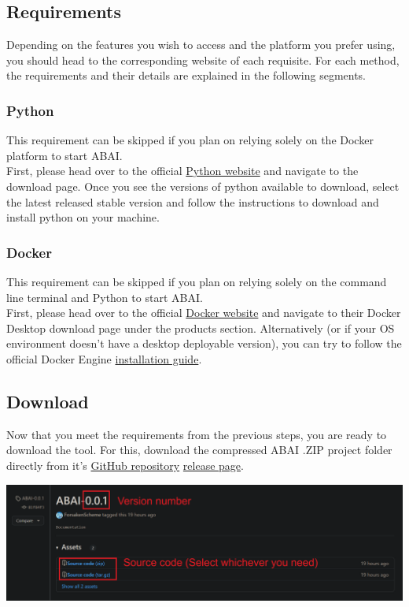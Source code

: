 \subsection{Requirements}
\label{subsec:Requirements}
Depending on the features you wish to access and the platform you prefer using, you should head to the corresponding website of each requisite. For each method, the requirements and their details are explained in the following segments. 

\subsubsection{Python}
This requirement can be skipped if you plan on relying solely on the Docker platform to start ABAI.\\

First, please head over to the official \href{https://www.python.org/}{Python website} and navigate to the download page. Once you see the versions of python available to download, select the latest released stable version and follow the instructions to download and install python on your machine. 

\subsubsection{Docker}
This requirement can be skipped if you plan on relying solely on the command line terminal and Python to start ABAI. \\

First, please head over to the official \href{https://www.docker.com/}{Docker website} and navigate to their Docker Desktop download page under the products section. Alternatively (or if your OS environment doesn't have a desktop deployable version), you can try to follow the official Docker Engine \href{https://docs.docker.com/engine/install/}{installation guide}.
\clearpage

\subsection{Download}
\label{subsec:Download}
Now that you meet the requirements from the previous steps, you are ready to download the tool. For this, download the compressed ABAI .ZIP project folder directly from it's \href{https://github.com/UNamurCSFaculty/2324_INFOB318_ABAI2}{GitHub repository} \href{https://github.com/UNamurCSFaculty/2324_INFOB318_ABAI2/releases/tag/ABAI-0.0.1}{release page}.
\begin{center}
\includegraphics[width=17cm]{Images/Download/releases.png}
\end{center}
